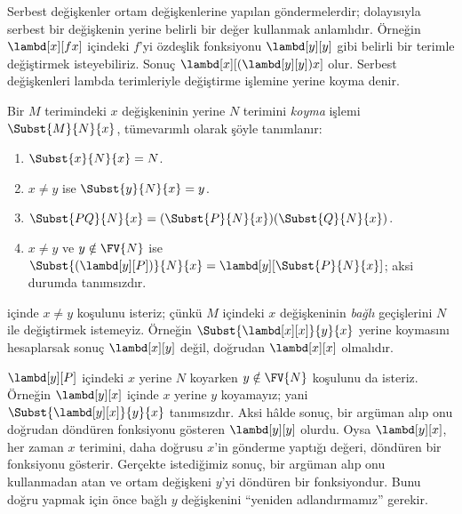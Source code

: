\documentclass[../../../include/open-logic-section]{subfiles}
\begin{document}

\begin{explain}
Serbest değişkenler ortam değişkenlerine yapılan göndermelerdir; dolayısıyla
serbest bir değişkenin yerine belirli bir değer kullanmak anlamlıdır. Örneğin
$\lambd[x][f x]$ içindeki $f$'yi özdeşlik fonksiyonu $\lambd[y][y]$ gibi
belirli bir terimle değiştirmek isteyebiliriz. Sonuç
$\lambd[x][(\lambd[y][y]) x]$ olur. Serbest değişkenleri lambda terimleriyle
değiştirme işlemine yerine koyma denir.
\end{explain}

\begin{defn} 
  Bir $M$ terimindeki $x$ değişkeninin yerine $N$ terimini
  \emph{koyma} işlemi $\Subst{M}{N}{x}$, tümevarımlı olarak şöyle tanımlanır:
  \begin{enumerate}
    \item $\Subst{x}{N}{x} = N$. 
    \item $x \neq y$ ise $\Subst{y}{N}{x}  = y$.
    \item $\Subst{PQ}{N}{x}  = (\Subst{P}{N}{x}) (\Subst{Q}{N}{x})$.
    \item $x \neq y$ ve $y \notin \FV{N}$ ise
      $\Subst{(\lambd[y][P])}{N}{x} =
      \lambd[y][\Subst{P}{N}{x}]$; aksi durumda tanımsızdır.
  \end{enumerate}
\end{defn}

\begin{explain}
 içinde $x\neq y$
koşulunu isteriz; çünkü $M$ içindeki $x$ değişkeninin \emph{bağlı}
geçişlerini $N$ ile değiştirmek istemeyiz. Örneğin
$\Subst{\lambd[x][x]}{y}{x}$ yerine koymasını hesaplarsak sonuç
$\lambd[x][y]$ değil, doğrudan $\lambd[x][x]$ olmalıdır.

$\lambd[y][P]$ içindeki $x$ yerine $N$ koyarken $y\notin\FV{N}$ koşulunu da
isteriz. Örneğin $\lambd[y][x]$ içinde $x$ yerine $y$ koyamayız; yani
$\Subst{\lambd[y][x]}{y}{x}$ tanımsızdır. Aksi hâlde sonuç, bir argüman alıp
onu doğrudan döndüren fonksiyonu gösteren $\lambd[y][y]$ olurdu. Oysa
$\lambd[y][x]$, her zaman $x$ terimini, daha doğrusu $x$'in gönderme yaptığı
değeri, döndüren bir fonksiyonu gösterir. Gerçekte istediğimiz sonuç, bir
argüman alıp onu kullanmadan atan ve ortam değişkeni $y$'yi döndüren bir
fonksiyondur. Bunu doğru yapmak için önce bağlı $y$ değişkenini
``yeniden adlandırmamız'' gerekir.
\end{explain}
\end{document}
